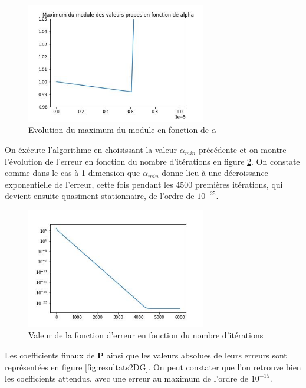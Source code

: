\documentclass[12pt]{report}
\begin{document}
\begin{figure}
    \centering
    \includegraphics[width=0.7\textwidth]{choix_alpha_2D.jpg}
    \caption{Evolution du maximum du module en fonction de $\alpha$}
    \label{fig:choix_alpha_2D}
\end{figure}

On éxécute l'algorithme en choisissant la valeur $\alpha_{min}$ précédente et on montre l'évolution de l'erreur en fonction du nombre d'itérations en figure \ref{fig:Erreur_2_DG}.
On constate comme dans le cas à 1 dimension que $\alpha_{min}$ donne lieu à une décroissance exponentielle de l'erreur, cette fois pendant les 4500 premières itérations, qui devient ensuite quasiment stationnaire, de l'ordre de $10^{-25}$.

\begin{figure}
    \centering
    \includegraphics[width=0.7\textwidth]{Erreur_2_DG.jpg}
    \caption{Valeur de la fonction d'erreur en fonction du nombre d'itérations}
    \label{fig:Erreur_2_DG}
\end{figure}

Les coefficients finaux de $\bm{P}$ ainsi que les valeurs absolues de leurs erreurs sont représentées en figure \ref{fig:resultats2DG}.
On peut constater que l'on retrouve bien les coefficients attendus, avec une erreur au maximum de l'ordre de $10^{-15}$.
\end{document}
